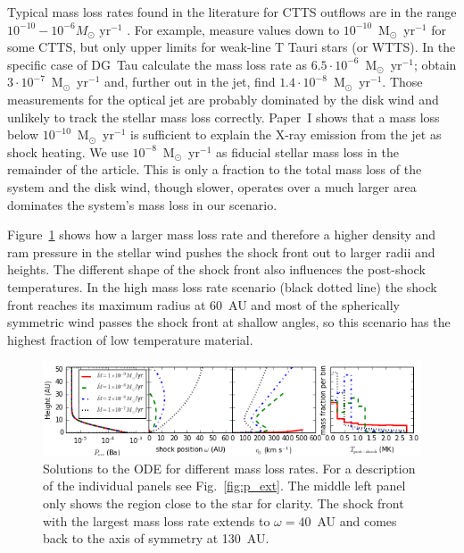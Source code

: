 \documentclass[manuscript]{aastex}
\begin{document}
Typical mass loss rates found in the literature for CTTS outflows are in the range $10^{-10}-10^{-6}M_{\odot}\textrm{ yr}^{-1}$ \citep{1999A&A...342..717B,2006A&A...456..189P}. For example, \citet{2006ApJ...646..319E} measure values down to $10^{-10}$~M$_{\odot}$~yr$^{-1}$ for some CTTS, but only upper limits for weak-line T Tauri stars (or WTTS). In the specific case of DG~Tau \citet{1997A&A...327..671L} calculate the  mass loss rate as $6.5\cdot 10^{-6}$~M$_{\odot}$~yr$^{-1}$; \citet{1995ApJ...452..736H}
obtain $3\cdot 10^{-7}$~M$_{\odot}$~yr$^{-1}$ and, further out in the jet, \citet{2000A&A...356L..41L} find $1.4\cdot 10^{-8}$~M$_{\odot}$~yr$^{-1}$. Those measurements for the optical jet are probably dominated by the disk wind \citep[e.g.][]{2014arXiv1404.0728W} and unlikely to track the stellar mass loss correctly.
Paper~I shows that a mass loss below $10^{-10}$~M$_{\odot}$~yr$^{-1}$ is sufficient to explain the X-ray emission from the jet as shock heating.
We use $10^{-8}$~M$_{\odot}$~yr$^{-1}$ as fiducial stellar mass loss in the remainder of the article. This is only a fraction to the total mass loss of the system and the disk wind, though slower, operates over a much larger area dominates the system's mass loss in our scenario.

Figure~\ref{fig:dot_m} shows how a larger mass loss rate and therefore a higher density and ram pressure in the stellar wind pushes the shock front out to larger radii and heights. The different shape of the shock front also influences the post-shock temperatures. In the high mass loss rate scenario (black dotted line) the shock front reaches its maximum radius at 60~AU and most of the spherically symmetric wind passes the shock front at shallow angles, so this scenario has the highest fraction of low temperature material.


\begin{figure}[h!]
\begin{center}
\includegraphics[width=1\columnwidth]{figures/dot_m/dot_m.png}
\caption{\label{fig:dot_m}
Solutions to the ODE for different mass loss rates. For a description of the individual panels see Fig.~\ref{fig:p_ext}. The middle left panel only shows the region close to the star for clarity. The shock front with the largest mass loss rate extends to $\omega=40$~AU and comes back to the axis of symmetry at 130~AU.}
\end{center}
\end{figure}
\end{document}
